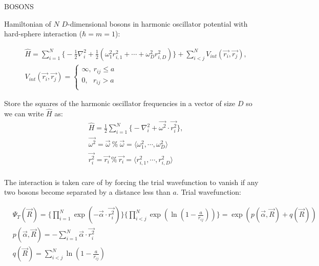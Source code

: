 \documentclass[12pt]{article}
\begin{document}
\begin{center}
\begin{large}
BOSONS
\end{large}
\end{center}

\noindent Hamiltonian of $N$ $D$-dimensional bosons in harmonic oscillator potential with hard-sphere interaction ($\hbar = m = 1$):

\begin{align}
&\hat{H} = \sum_{i=1}^N \Big\{ -\frac{1}{2}\nabla_i^2 + \frac{1}{2}(\omega_1^2r_{i,1}^2+\cdots+\omega_{D}^2r_{i,D}^2) \Big\} + \sum_{i<j}^N V_{int}(\vec{r_i},\vec{r_j}),\\
&V_{int}(\vec{r_i},\vec{r_j}) =\left\{
                \begin{array}{ll}
                  \infty, \ r_{ij} \leq a \\
                  0, \ \ \ r_{ij} > a \\
                \end{array}
              \right.
\end{align}

\noindent Store the squares of the harmonic oscillator frequencies in a vector of size $D$ so we can write $\hat{H}$ as:
\begin{align}
&\hat{H} = \frac{1}{2} \sum_{i=1}^N \Big\{ -\nabla_i^2 + \vec{\omega^2}\cdot \vec{r_i^2} \Big\},\\
&\vec{\omega^2} =\vec{\omega} \ \% \ \vec{\omega} =  \langle \omega_1^2,\cdots, \omega_D^2 \rangle\\
&\vec{r_i^2} = \vec{r_i} \ \% \ \vec{r_i} =  \langle r_{i,1}^2,\cdots, r_{i,D}^2 \rangle\\
\end{align}

\noindent The interaction is taken care of by forcing the trial wavefunction to vanish if any two bosons become separated by a distance less than $a$. Trial wavefunction:

\begin{align}
&\Psi_T(\vec{R}) = \Big\{ \prod_{i=1}^N \exp(-\vec{\alpha}\cdot \vec{r_i^2} ) \Big\} \Big\{ \prod_{i<j}^N \exp \left( \ln \left( 1-\frac{a}{r_{ij}}\right) \right) \Big\}= \exp \left( p(\vec{\alpha},\vec{R}) + q(\vec{R}) \right)\\
&p(\vec{\alpha},\vec{R})= - \sum_{i=1}^N \vec{\alpha}\cdot\vec{r_i^2}\\
&q(\vec{R}) = \sum_{i<j}^N  \ln \left( 1-\frac{a}{r_{ij}}\right)
\end{align}
\end{document}
